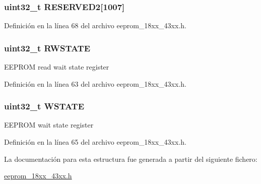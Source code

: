 \subsubsection[{\texorpdfstring{R\+E\+S\+E\+R\+V\+E\+D2}{RESERVED2}}]{\setlength{\rightskip}{0pt plus 5cm}uint32\+\_\+t R\+E\+S\+E\+R\+V\+E\+D2\mbox{[}1007\mbox{]}}\hypertarget{struct_l_p_c___e_e_p_r_o_m___t_a31d5cbfb3da72128c0b57d47157dfa5a}{}\label{struct_l_p_c___e_e_p_r_o_m___t_a31d5cbfb3da72128c0b57d47157dfa5a}


Definición en la línea 68 del archivo eeprom\+\_\+18xx\+\_\+43xx.\+h.

\subsubsection[{\texorpdfstring{R\+W\+S\+T\+A\+TE}{RWSTATE}}]{ uint32\+\_\+t R\+W\+S\+T\+A\+TE}\hypertarget{struct_l_p_c___e_e_p_r_o_m___t_a99777f3d154977c3ff34e949a39110fa}{}\label{struct_l_p_c___e_e_p_r_o_m___t_a99777f3d154977c3ff34e949a39110fa}
E\+E\+P\+R\+OM read wait state register 

Definición en la línea 63 del archivo eeprom\+\_\+18xx\+\_\+43xx.\+h.

\subsubsection[{\texorpdfstring{W\+S\+T\+A\+TE}{WSTATE}}]{ uint32\+\_\+t W\+S\+T\+A\+TE}\hypertarget{struct_l_p_c___e_e_p_r_o_m___t_a6617b0d909a2a943b1b5a016d44631ba}{}\label{struct_l_p_c___e_e_p_r_o_m___t_a6617b0d909a2a943b1b5a016d44631ba}
E\+E\+P\+R\+OM wait state register 

Definición en la línea 65 del archivo eeprom\+\_\+18xx\+\_\+43xx.\+h.



La documentación para esta estructura fue generada a partir del siguiente fichero\+:\begin{DoxyCompactItemize}
\item 
\hyperlink{eeprom__18xx__43xx_8h}{eeprom\+\_\+18xx\+\_\+43xx.\+h}\end{DoxyCompactItemize}
